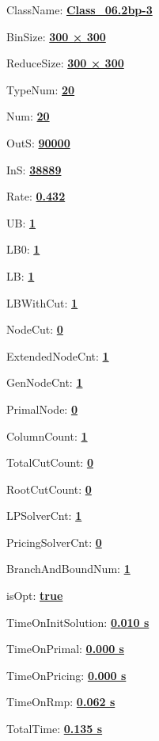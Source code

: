 \documentclass[11pt]{article}
\begin{document}
\pagestyle{empty}


ClassName: \underline{\textbf{Class_06.2bp-3}}
\par
BinSize: \underline{\textbf{300 × 300}}
\par
ReduceSize: \underline{\textbf{300 × 300}}
\par
TypeNum: \underline{\textbf{20}}
\par
Num: \underline{\textbf{20}}
\par
OutS: \underline{\textbf{90000}}
\par
InS: \underline{\textbf{38889}}
\par
Rate: \underline{\textbf{0.432}}
\par
UB: \underline{\textbf{1}}
\par
LB0: \underline{\textbf{1}}
\par
LB: \underline{\textbf{1}}
\par
LBWithCut: \underline{\textbf{1}}
\par
NodeCut: \underline{\textbf{0}}
\par
ExtendedNodeCnt: \underline{\textbf{1}}
\par
GenNodeCnt: \underline{\textbf{1}}
\par
PrimalNode: \underline{\textbf{0}}
\par
ColumnCount: \underline{\textbf{1}}
\par
TotalCutCount: \underline{\textbf{0}}
\par
RootCutCount: \underline{\textbf{0}}
\par
LPSolverCnt: \underline{\textbf{1}}
\par
PricingSolverCnt: \underline{\textbf{0}}
\par
BranchAndBoundNum: \underline{\textbf{1}}
\par
isOpt: \underline{\textbf{true}}
\par
TimeOnInitSolution: \underline{\textbf{0.010 s}}
\par
TimeOnPrimal: \underline{\textbf{0.000 s}}
\par
TimeOnPricing: \underline{\textbf{0.000 s}}
\par
TimeOnRmp: \underline{\textbf{0.062 s}}
\par
TotalTime: \underline{\textbf{0.135 s}}
\par
\newpage
\end{document}
